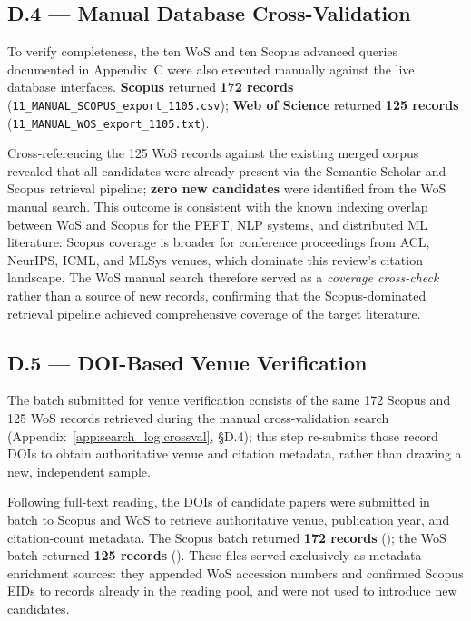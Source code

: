 \subsection*{D.4 — Manual Database Cross-Validation}
\label{app:search_log:crossval}

To verify completeness, the ten WoS and ten Scopus advanced queries documented in
Appendix~C were also executed manually against the live database interfaces.
\textbf{Scopus} returned \textbf{172 records}
(\texttt{11\_MANUAL\_SCOPUS\_export\_1105.csv}); \textbf{Web of Science} returned
\textbf{125 records} (\texttt{11\_MANUAL\_WOS\_export\_1105.txt}).

Cross-referencing the 125 WoS records against the existing merged corpus revealed that
all candidates were already present via the Semantic Scholar and Scopus retrieval
pipeline; \textbf{zero new candidates} were identified from the WoS manual search.
This outcome is consistent with the known indexing overlap between WoS and Scopus for
the PEFT, NLP systems, and distributed ML literature: Scopus coverage is broader for
conference proceedings from ACL, NeurIPS, ICML, and MLSys venues, which dominate this
review's citation landscape. The WoS manual search therefore served as a \textit{coverage
cross-check} rather than a source of new records, confirming that the Scopus-dominated
retrieval pipeline achieved comprehensive coverage of the target literature.

\subsection*{D.5 — DOI-Based Venue Verification}
\label{app:search_log:doi}

The batch submitted for venue verification consists of the same 172 Scopus and
125 WoS records retrieved during the manual cross-validation search
(Appendix~\ref{app:search_log:crossval}, \S D.4); this step re-submits those
record DOIs to obtain authoritative venue and citation metadata, rather than
drawing a new, independent sample.

Following full-text reading, the DOIs of candidate papers were submitted in batch to
Scopus and WoS to retrieve authoritative venue, publication year, and citation-count
metadata. The Scopus batch returned \textbf{172 records}
(\texttt{}); the WoS batch returned
\textbf{125 records} (\texttt{}). These
files served exclusively as metadata enrichment sources: they appended WoS accession
numbers and confirmed Scopus EIDs to records already in the reading pool, and were not
used to introduce new candidates.

